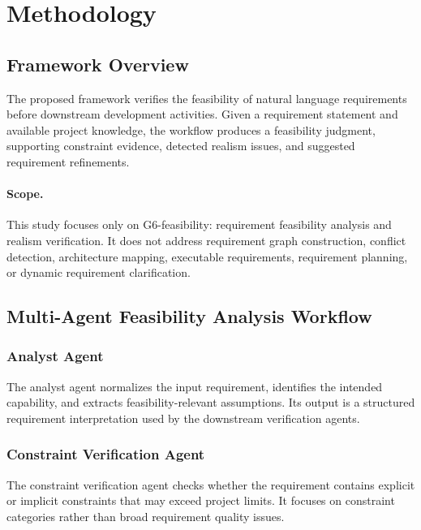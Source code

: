 \section{Methodology}
\label{methodology}

\subsection{Framework Overview}
\label{method:overview}

The proposed framework verifies the feasibility of natural language requirements before downstream development activities.
Given a requirement statement and available project knowledge, the workflow produces a feasibility judgment, supporting constraint evidence, detected realism issues, and suggested requirement refinements.

\paragraph{Scope.}
This study focuses only on G6-feasibility: requirement feasibility analysis and realism verification.
It does not address requirement graph construction, conflict detection, architecture mapping, executable requirements, requirement planning, or dynamic requirement clarification.

\subsection{Multi-Agent Feasibility Analysis Workflow}
\label{method:workflow}

\subsubsection{Analyst Agent}
\label{method:analyst_agent}

The analyst agent normalizes the input requirement, identifies the intended capability, and extracts feasibility-relevant assumptions.
Its output is a structured requirement interpretation used by the downstream verification agents.

\subsubsection{Constraint Verification Agent}
\label{method:constraint_agent}

The constraint verification agent checks whether the requirement contains explicit or implicit constraints that may exceed project limits.
It focuses on constraint categories rather than broad requirement quality issues.


